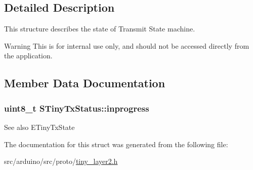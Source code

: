 \subsection{Detailed Description}
This structure describes the state of Transmit State machine. \begin{DoxyWarning}{Warning}
This is for internal use only, and should not be accessed directly from the application. 
\end{DoxyWarning}


\subsection{Member Data Documentation}
\hypertarget{structSTinyTxStatus_a8d7fa9861ba2adb1fd4ad4689548d238}{}
\subsubsection[{inprogress}]{\setlength{\rightskip}{0pt plus 5cm}uint8\+\_\+t S\+Tiny\+Tx\+Status\+::inprogress}\label{structSTinyTxStatus_a8d7fa9861ba2adb1fd4ad4689548d238}
\begin{DoxySeeAlso}{See also}
E\+Tiny\+Tx\+State 
\end{DoxySeeAlso}


The documentation for this struct was generated from the following file\+:\begin{DoxyCompactItemize}
\item 
src/arduino/src/proto/\hyperlink{src_2arduino_2src_2proto_2tiny__layer2_8h}{tiny\+\_\+layer2.\+h}\end{DoxyCompactItemize}
